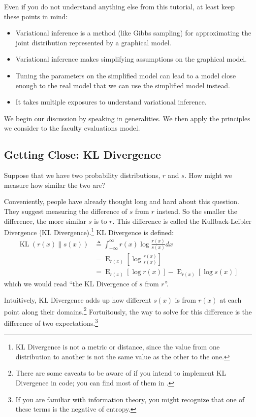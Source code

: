 \documentclass[12pt]{article}
\newcommand{\KL}{\operatorname{KL}}
\newcommand{\E}{\operatorname{E}}
\begin{document}
Even if you do not understand anything else from this tutorial, at least keep
these points in mind:

\begin{itemize}
    \item Variational inference is a method (like Gibbs sampling) for
        approximating the joint distribution represented by a graphical model.
    \item Variational inference makes simplifying assumptions on the graphical
        model.
    \item Tuning the parameters on the simplified model can lead to a model
        close enough to the real model that we can use the simplified model
        instead.
    \item It takes multiple exposures to understand variational inference.
\end{itemize}

We begin our discussion by speaking in generalities.  We then apply the
principles we consider to the faculty evaluations model.

\subsection{Getting Close:  KL Divergence}

Suppose that we have two probability distributions, $r$ and $s$.  How might we
measure how similar the two are?

Conveniently, people have already thought long and hard about this question.
They suggest measuring the difference of $s$ from $r$ instead.  So the smaller
the difference, the more similar $s$ is to $r$.  This difference is called the
Kullback-Leibler Divergence (KL Divergence).\footnote{KL Divergence is not a
metric or distance, since the value from one distribution to another is not the
same value as the other to the one.} KL Divergence is defined:
\begin{align}\label{eq:kldivergence}
    \KL(r(x)\parallel s(x)) &\triangleq \int_{-\infty}^{\infty} r(x)
    \log{\frac{r(x)}{s(x)}}dx
    \nonumber \\
    &= \E_{r(x)}[\log \frac{r(x)}{s(x)}]
    \nonumber \\
    &= \E_{r(x)}[\log r(x)] - \E_{r(x)}[\log s(x)]
\end{align}
which we would read \enquote{the KL Divergence of $s$ from $r$}.

Intuitively, KL Divergence adds up how different $s(x)$ is from $r(x)$ at each
point along their domains.\footnote{There are some caveats to be aware of if you
intend to implement KL Divergence in code; you can find most of them in
\autocite{wikikl}.}  Fortuitously, the way to solve for this difference is the
difference of two expectations.\footnote{If you are familiar with information
theory, you might recognize that one of these terms is the negative of entropy.}
\end{document}
